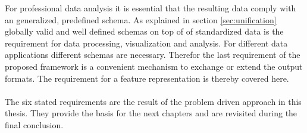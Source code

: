 For professional data analysis it is essential that the resulting data comply with an generalized, predefined schema. As explained in section \ref{sec:unification} globally valid and well defined schemas on top of of standardized data is the requirement for data processing, visualization and analysis. For different data applications different schemas are necessary. Therefor the last requirement of the proposed framework is a convenient mechanism to exchange or extend the output formats. The requirement for a feature representation is thereby covered here.
\\\\
The six stated requirements are the result of the problem driven approach in this thesis. They provide the basis for the next chapters and are revisited during the final conclusion.